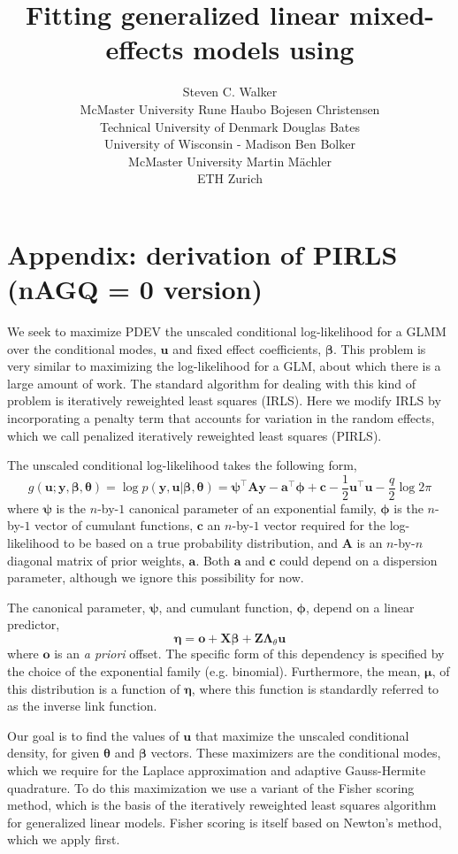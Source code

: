 \documentclass{jss}
\author{
  Steven C. Walker\\McMaster University \And
  Rune Haubo Bojesen Christensen\\Technical University of Denmark\AND
  Douglas Bates\\University of Wisconsin - Madison \And
  Ben Bolker\\McMaster University \AND
  Martin M\"achler\\ETH Zurich
}
\title{Fitting generalized linear \bmb{and nonlinear?} mixed-effects models using \pkg{lme4}}
\begin{document}

\section{Appendix: derivation of PIRLS (nAGQ = 0 version)}

We seek to maximize PDEV the unscaled conditional log-likelihood 
for a GLMM over the conditional modes, $\bm u$ and fixed effect
coefficients, $\bm\beta$. This problem is very similar to maximizing
the log-likelihood for a GLM, about which there is a large amount of
work. The standard algorithm for dealing with this kind of problem is
iteratively reweighted least squares (IRLS). Here we modify IRLS by
incorporating a penalty term that accounts for variation in the random
effects, which we call penalized iteratively reweighted least squares (PIRLS). 

The unscaled conditional log-likelihood takes the following form,
\begin{equation}
g(\bm u ; \bm y, \bm\beta, \bm\theta) = \log p(\bm y, \bm u | \bm\beta, \bm\theta) = 
\bm\psi^\top \bm A \bm y - 
\bm a^\top \bm \phi  + 
\bm c -
\frac{1}{2}\bm u^\top \bm u -
\frac{q}{2}\log{2\pi}
\end{equation}
where $\bm\psi$ is the $n$-by-$1$ canonical parameter of an exponential family,
$\bm\phi$ is the $n$-by-$1$ vector of cumulant functions, $\bm c$ an
$n$-by-$1$ vector required for the log-likelihood to be based on a
true probability distribution, and $\bm A$ is an $n$-by-$n$ diagonal
matrix of prior weights, $\bm a$. Both $\bm a$ and $\bm c$ could depend on a dispersion
parameter, although we ignore this possibility for now.

The canonical parameter, $\bm\psi$, and cumulant function, $\bm\phi$,
depend on a linear predictor,
\begin{equation}
\bm\eta = \bm o + \bm X \bm\beta + \bm Z \bm\Lambda_\theta \bm u
\end{equation}
where $\bm o$ is an \emph{a priori} offset. The specific form of this
dependency is specified by the choice of the exponential family
(e.g. binomial). Furthermore, the mean, $\bm\mu$, of this distribution
is a function of $\bm\eta$, where this function is standardly referred
to as the inverse link function.

Our goal is to find the values of $\bm u$ that maximize the unscaled
conditional density, for given $\bm\theta$ and $\bm\beta$
vectors. These maximizers are the conditional modes, which we require
for the Laplace approximation and adaptive Gauss-Hermite
quadrature. To do this maximization we use a variant of the Fisher
scoring method, which is the basis of the iteratively reweighted least
squares algorithm for generalized linear models. Fisher scoring is itself
based on Newton's method, which we apply first.
\end{document}
